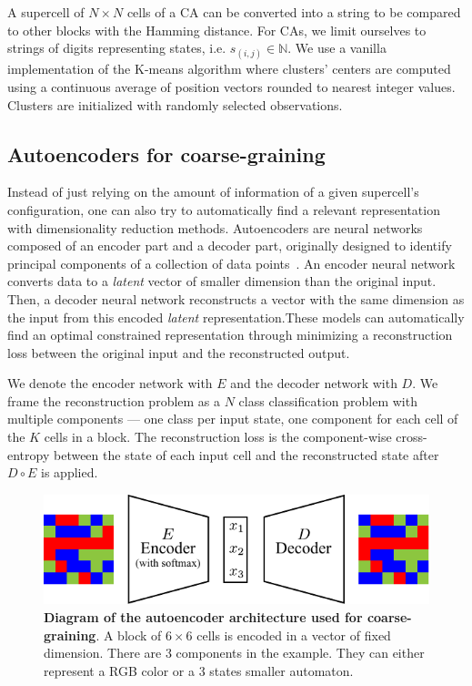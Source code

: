 A supercell of $N\times N$ cells of a CA can be converted into a string to be
compared to other blocks with the Hamming distance. For CAs, we limit ourselves
to strings of digits representing states, i.e. $s_{(i,j)} \in \mathbb{N}$. We
use a vanilla implementation of the K-means algorithm where clusters' centers
are computed using a continuous average of position vectors rounded to nearest
integer values. Clusters are initialized with randomly selected observations.

\subsection{Autoencoders for coarse-graining}

Instead of just relying on the amount of information of a given supercell's
configuration, one can also try to automatically find a relevant representation
with dimensionality reduction methods. Autoencoders are neural networks composed
of an encoder part and a decoder part, originally designed to identify principal
components of a collection of data
points~\cite{baldiNeuralNetworksPrincipal1989,
  hintonConnectionistLearningProcedures1989,
  kramerNonlinearPrincipalComponent1991}. An encoder neural network converts
data to a \emph{latent} vector of smaller dimension than the original input.
Then, a decoder neural network reconstructs a vector with the same dimension as
the input from this encoded \emph{latent} representation.These models can
automatically find an optimal constrained representation through minimizing a
reconstruction loss between the original input and the reconstructed output.

We denote the encoder network with $E$ and the decoder network with $D$. We frame
the reconstruction problem as a $N$ class classification problem with multiple
components --- one class per input state, one component for each cell of the $K$
cells in a block. The reconstruction loss is the component-wise cross-entropy
between the state of each input cell and the reconstructed state after $D \circ
E$ is applied.

\begin{figure}[th]
  \centering
  \includegraphics[width=\linewidth]{figures/autoencoder.pdf}
  \caption{\label{fig:autoencoder} \textbf{Diagram of the autoencoder
      architecture used for coarse-graining}. A block of $6\times 6$ cells is
    encoded in a vector of fixed dimension. There are 3 components in the
    example. They can either represent a RGB color or a 3 states smaller
    automaton.}
\end{figure}

